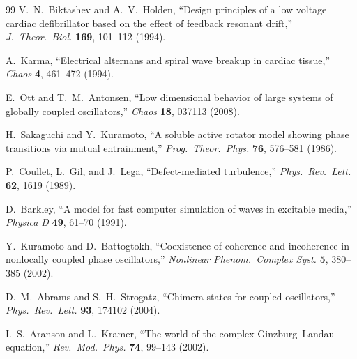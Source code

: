 \documentclass[11pt,a4paper]{article}
\begin{document}
\begin{thebibliography}{99}
V.~N.~Biktashev and A.~V.~Holden,
``Design principles of a low voltage cardiac defibrillator
based on the effect of feedback resonant drift,''
\textit{J.\ Theor.\ Biol.} \textbf{169}, 101--112 (1994).

A.~Karma,
``Electrical alternans and spiral wave breakup in cardiac
tissue,''
\textit{Chaos} \textbf{4}, 461--472 (1994).

E.~Ott and T.~M.~Antonsen,
``Low dimensional behavior of large systems of globally
coupled oscillators,''
\textit{Chaos} \textbf{18}, 037113 (2008).

H.~Sakaguchi and Y.~Kuramoto,
``A soluble active rotator model showing phase transitions
via mutual entrainment,''
\textit{Prog.\ Theor.\ Phys.} \textbf{76}, 576--581 (1986).

P.~Coullet, L.~Gil, and J.~Lega,
``Defect-mediated turbulence,''
\textit{Phys.\ Rev.\ Lett.} \textbf{62}, 1619 (1989).

D.~Barkley,
``A model for fast computer simulation of waves in excitable
media,''
\textit{Physica D} \textbf{49}, 61--70 (1991).

Y.~Kuramoto and D.~Battogtokh,
``Coexistence of coherence and incoherence in nonlocally
coupled phase oscillators,''
\textit{Nonlinear Phenom.\ Complex Syst.} \textbf{5},
380--385 (2002).

D.~M.~Abrams and S.~H.~Strogatz,
``Chimera states for coupled oscillators,''
\textit{Phys.\ Rev.\ Lett.} \textbf{93}, 174102 (2004).

I.~S.~Aranson and L.~Kramer,
``The world of the complex Ginzburg--Landau equation,''
\textit{Rev.\ Mod.\ Phys.} \textbf{74}, 99--143 (2002).

\end{thebibliography}
\end{document}
